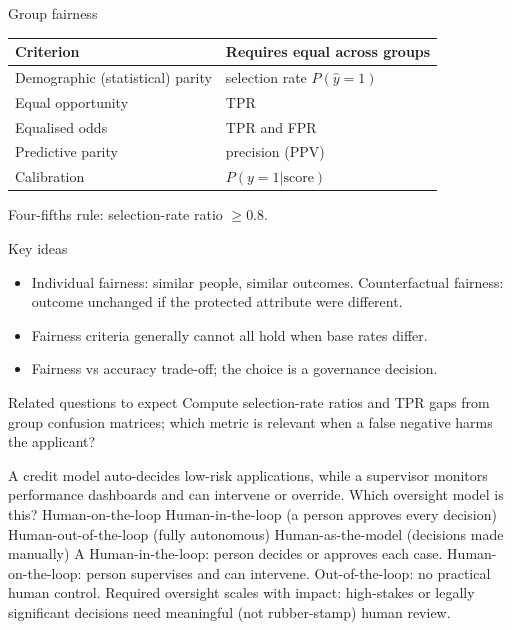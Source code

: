 {\begin{block}{Group fairness}
		\begin{center}\scriptsize
			\begin{tabular}{@{}ll@{}}
				\toprule
				Criterion & Requires equal across groups \\
				\midrule
				Demographic (statistical) parity & selection rate $P(\hat y=1)$ \\
				Equal opportunity & TPR \\
				Equalised odds & TPR and FPR \\
				Predictive parity & precision (PPV) \\
				Calibration & $P(y=1|\text{score})$ \\
				\bottomrule
		\end{tabular}\end{center}
		Four-fifths rule: selection-rate ratio $\ge0.8$.\end{block}}
{\begin{block}{Key ideas}
		\begin{itemize}
			\item Individual fairness: similar people, similar outcomes. Counterfactual fairness: outcome unchanged if the protected attribute were different.
			\item Fairness criteria generally cannot all hold when base rates differ.
			\item Fairness vs accuracy trade-off; the choice is a governance decision.
	\end{itemize}\end{block}
	\begin{alertblock}{Related questions to expect}
		Compute selection-rate ratios and TPR gaps from group confusion matrices; which metric is relevant when a false negative harms the applicant?
\end{alertblock}}

{A credit model auto-decides low-risk applications, while a supervisor monitors performance dashboards and can intervene or override. Which oversight model is this?}
{Human-on-the-loop}
{Human-in-the-loop (a person approves every decision)}
{Human-out-of-the-loop (fully autonomous)}
{Human-as-the-model (decisions made manually)}
{A}
{Human-in-the-loop: person decides or approves each case. Human-on-the-loop: person supervises and can intervene. Out-of-the-loop: no practical human control. Required oversight scales with impact: high-stakes or legally significant decisions need meaningful (not rubber-stamp) human review.}

